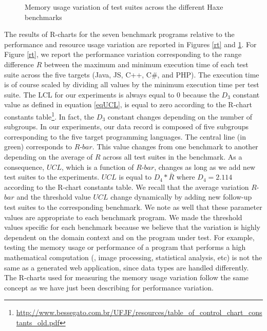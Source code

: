 \begin{figure}
	\caption{Memory usage variation of test suites across the different Haxe benchmarks}
	\label{rm}
\end{figure}
The results of R-charts for the seven benchmark programs relative to the performance and resource usage variation are reported in Figures \ref{rt} and \ref{rm}. For Figure \ref{rt}, we report the performance variation corresponding to the range difference $R$ between the maximum and minimum execution time of each test suite across the five targets (Java, JS, C++, C\#, and PHP). 
The execution time is of course scaled by dividing all values by the minimum execution time per test suite. 
The LCL for our experiments is always equal to 0 because the $D_{3}$ constant value as defined in equation \ref{eqUCL}, is equal to zero according to the R-chart constants table\footnote{\url{http://www.bessegato.com.br/UFJF/resources/table_of_control_chart_constants_old.pdf}}. In fact, the $D_{3}$ constant changes depending on the number of subgroups. In our experiments, our data record is composed of five subgroups corresponding to the five target programming languages.
The central line (in green) corresponds to $R$-$bar$. This value changes from one benchmark to another depending on the average of $R$ across all test suites in the benchmark. As a consequence, $UCL$, which is a function of $R$-$bar$, changes as long as we add new test suites to the experiments. $UCL$ is equal to $D_{4}*\bar{R}$ where $D_{4}=2.114$ according to the R-chart constants table. We recall that the average variation $R$-$bar$ and the threshold value $UCL$ change dynamically by adding new follow-up test suites to the corresponding benchmark. 
We note as well that these parameter values are appropriate to each benchmark program. We made the threshold values specific for each benchmark because we believe that the variation is highly dependent on the domain context and on the program under test. For example, testing the memory usage or performance of a program that performs a high mathematical computation (\eg, image processing, statistical analysis, etc) is not the same as a generated web application, since data types are handled differently. The R-charts used for measuring the memory usage variation follow the same concept as we have just been describing for performance variation.  

